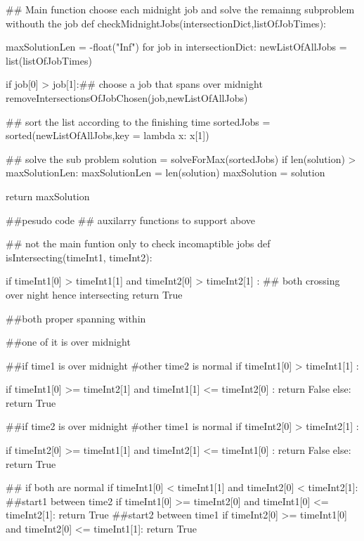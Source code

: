\documentclass[11pt]{article}
\begin{document}
## Main function choose each midnight job and solve the remainng subproblem withouth the job
def checkMidnightJobs(intersectionDict,listOfJobTimes):

    maxSolutionLen = -float("Inf")    
    for job in intersectionDict: 
        newListOfAllJobs = list(listOfJobTimes)
        
        if job[0] > job[1]:## choose a job that spans over midnight
            removeIntersectionsOfJobChosen(job,newListOfAllJobs)
            
            ## sort the list according to the finishing time
            sortedJobs = sorted(newListOfAllJobs,key = lambda x: x[1])
            
            ## solve the sub problem
            solution   = solveForMax(sortedJobs)
            if len(solution) > maxSolutionLen:
                maxSolutionLen = len(solution)
                maxSolution = solution
                
    return maxSolution   

##pesudo code
## auxilarry functions to support above

## not the main funtion only to check incomaptible jobs
def isIntersecting(timeInt1, timeInt2):
    
    if timeInt1[0] > timeInt1[1] and timeInt2[0] > timeInt2[1] : 
    ## both crossing over night hence intersecting
        return True
    
    ##both proper spanning within

            
    ##one of it is over midnight
    
        ##if time1 is over midnight
        #other time2  is normal
    if timeInt1[0] > timeInt1[1] : 
        
        if timeInt1[0] >=  timeInt2[1] and timeInt1[1] <=  timeInt2[0] :
            return False
        else:
            return True
   
    ##if time2 is over midnight
    #other time1 is normal
    if timeInt2[0] > timeInt2[1] : 
        
        if timeInt2[0] >=  timeInt1[1] and timeInt2[1] <=  timeInt1[0] :
            return False
        else:
            return True
    
    
    ## if both are normal
    if timeInt1[0] < timeInt1[1] and timeInt2[0] < timeInt2[1]:
        ##start1 between time2
        if timeInt1[0] >= timeInt2[0] and timeInt1[0] <= timeInt2[1]:
            return True
        ##start2 between time1
        if timeInt2[0] >= timeInt1[0] and timeInt2[0] <= timeInt1[1]:
            return True       
        
\end{document}
